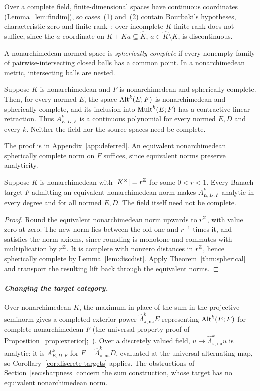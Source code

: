 Over a complete field, finite-dimensional spaces have continuous coordinates (Lemma~\ref{lem:findim}), so cases~(1)
and~(2) contain Bourbaki's hypotheses, characteristic zero and finite rank~\cite[n\textsuperscript{o}~7.8]{Bou}; over
incomplete $K$ finite rank does not suffice, since the $a$-coordinate on $K+Ka\subseteq\widehat K$,
$a\in\widehat K\setminus K$, is discontinuous.

A nonarchimedean normed space is \emph{spherically complete} if every nonempty family of pairwise-intersecting
closed balls has a common point. In a nonarchimedean metric, intersecting balls are nested.

\begin{theorem}\label{thm:spherical}
Suppose $K$ is nonarchimedean and $F$ is nonarchimedean and spherically complete. Then, for every normed $E$, the space $\operatorname{Alt}^k(E;F)$ is nonarchimedean and spherically complete, and its inclusion into $\operatorname{Mult}^k(E;F)$ has a contractive linear retraction. Thus $A^k_{E,D;F}$ is a continuous polynomial for every normed $E,D$ and every $k$. Neither the field nor the source spaces need be complete.
\end{theorem}
The proof is in Appendix~\ref{app:deferred}. An equivalent nonarchimedean spherically complete norm on $F$ suffices,
since equivalent norms preserve analyticity.

\begin{corollary}\label{cor:discrete-targets}
Suppose $K$ is nonarchimedean with $\lvert K^\times\rvert=r^\mathbb Z$ for some $0<r<1$.
Every Banach target $F$ admitting an equivalent nonarchimedean norm makes $A^k_{E,D;F}$
analytic in every degree and for all normed $E,D$. The field itself need not be complete.
\end{corollary}
\begin{proof}
Round the equivalent nonarchimedean norm upwards to $r^\mathbb Z$, with value zero at zero. The new norm lies between the old
one and $r^{-1}$ times it, and satisfies the norm axioms, since rounding is monotone and commutes with multiplication by
$r^\mathbb Z$. It is complete with nonzero distances in $r^\mathbb Z$, hence spherically complete by Lemma~\ref{lem:discdist}. Apply
Theorem~\ref{thm:spherical} and transport the resulting lift back through the equivalent norms.
\end{proof}

\paragraph{\textit{Changing the target category.}}
Over nonarchimedean $K$, the maximum in place of the sum in the projective seminorm gives a completed exterior power
$\widehat\Lambda^k_{\pi,\mathrm{na}}E$ representing $\operatorname{Alt}^k(E;F)$ for complete nonarchimedean $F$ (the universal-property
proof of Proposition~\ref{prop:exterior};~\cite[\S4]{Se}). Over a discretely valued field,
$u\mapsto\widehat\Lambda^k_{\pi,\mathrm{na}}u$ is analytic: it is $A^k_{E,D;F}$ for $F=\widehat\Lambda^k_{\pi,\mathrm{na}}D$,
evaluated at the universal alternating map, so Corollary~\ref{cor:discrete-targets} applies. The obstructions of
Section~\ref{sec:sharpness} concern the sum construction, whose target has no equivalent nonarchimedean norm.

